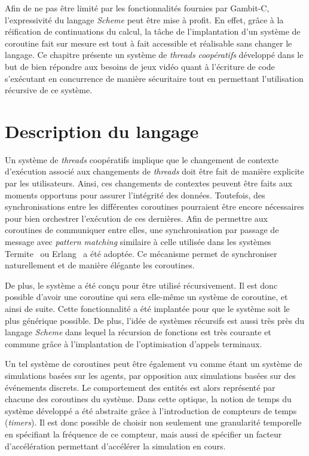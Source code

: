 \documentclass[12pt,twoside,letterpaper,francais]{book}
\newcommand{\Schemelang}{{\textit{Scheme }}}
\begin{document}
Afin de ne pas être limité par les fonctionnalités fournies par
Gambit-C, l'expressivité du langage \Schemelang peut être mise à
profit. En effet, grâce à la réification de continuations du calcul,
la tâche de l'implantation d'un système de coroutine fait sur mesure
est tout à fait accessible et réalisable sans changer le langage. Ce
chapitre présente un système de \textit{threads} \emph{coopératifs}
développé dans le but de bien répondre aux besoins de jeux vidéo quant
à l'écriture de code s'exécutant en concurrence de manière sécuritaire
tout en permettant l'utilisation récursive de ce système.


\FloatBarrier
\section{Description du langage}
Un système de \textit{threads} coopératifs implique que le changement
de contexte d'exécution associé aux changements de \textit{threads}
doit être fait de manière explicite par les utilisateurs. Ainsi, ces
changements de contextes peuvent être faits aux moments opportuns pour
assurer l'intégrité des données. Toutefois, des synchronisations entre
les différentes coroutines pourraient être encore nécessaires pour
bien orchestrer l'exécution de ces dernières. Afin de permettre aux
coroutines de communiquer entre elles, une synchronisation par passage
de message avec \textit{pattern matching} similaire à celle utilisée
dans les systèmes Termite~\cite{Termite_paper} ou Erlang~\cite{Erlang}
a été adoptée. Ce mécanisme permet de synchroniser naturellement et de
manière élégante les coroutines.

De plus, le système a été conçu pour être utilisé récursivement. Il
est donc possible d'avoir une coroutine qui sera elle-même un système
de coroutine, et ainsi de suite. Cette fonctionnalité a été implantée
pour que le système soit le plus générique possible. De plus, l'idée
de systèmes récursifs est aussi très près du langage \Schemelang dans
lequel la récursion de fonctions est très courante et commune grâce à
l'implantation de l'optimisation d'appels terminaux.

Un tel système de coroutines peut être également vu comme étant un
système de simulations basées sur les agents, par opposition aux
simulations basées sur des événements discrets. Le comportement des
entités est alors représenté par chacune des coroutines du
système. Dans cette optique, la notion de temps du système développé a
été abstraite grâce à l'introduction de compteurs de temps
(\textit{timers}). Il est donc possible de choisir non seulement une
granularité temporelle en spécifiant la fréquence de ce compteur, mais
aussi de spécifier un facteur d'accélération permettant d'accélérer la
simulation en cours.
\end{document}
